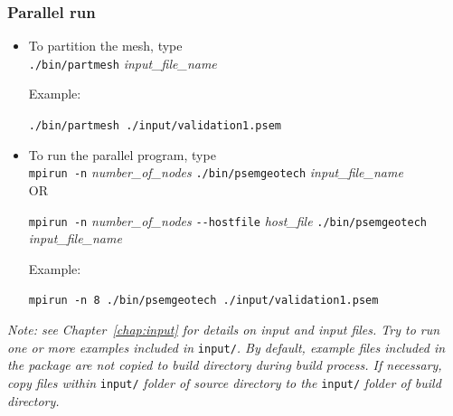 \subsubsection{Parallel run}
\begin{itemize}[-]
\item To partition the mesh, type \\
    \texttt{./bin/partmesh} \emph{input\_file\_name}

    Example:

    \texttt{./bin/partmesh ./input/validation1.psem}

\item To run the parallel program, type \\
    \texttt{mpirun -n} \emph{number\_of\_nodes} \texttt{./bin/psemgeotech} \emph{input\_file\_name} \\

    OR

    \texttt{mpirun -n} \emph{number\_of\_nodes} \texttt{-{}-hostfile} \emph{host\_file} \texttt{./bin/psemgeotech} \emph{input\_file\_name}

    Example:

    \texttt{mpirun -n 8 ./bin/psemgeotech ./input/validation1.psem}
\end{itemize}

{\emph{Note: see Chapter~\ref{chap:input} for details on input and input files. Try to run one or more examples included in}} \texttt{input/}{\emph{. By default, example files included in the package are not copied to build directory during build process. If necessary, copy files within}} \texttt{input/} {\emph{folder of source directory to the}} \texttt{input/} {\emph{folder of build directory.}}
